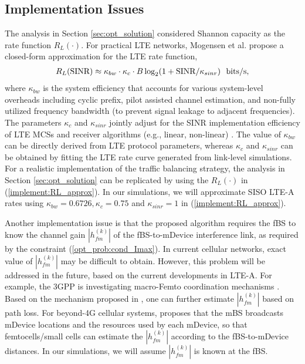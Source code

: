 \documentclass[journal,final,letterpaper,10pt,doublecolumn,twoside]{IEEEtran}
\begin{document}
\subsection{Implementation Issues} \label{subsec:Traffic-assign-Implementation}

The analysis in Section \ref{sec:opt_solution} considered  Shannon capacity as the rate function $R_L(\cdot)$. For practical LTE networks, Mogensen et al. \cite{LteRateApprox} propose a closed-form approximation for the LTE rate function,
\begin{eqnarray}
R_L(\textmd{SINR}) \approx \kappa_{bw} \cdot \kappa_{c} \cdot B
\log_2(1+\textmd{SINR} / \kappa_{sinr} ) ~~ \textmd{bits/s},
\label{implement:RL_approx}
\end{eqnarray}
where $\kappa_{bw}$ is the system efficiency that accounts for various system-level overheads including cyclic prefix,
pilot assisted channel estimation, and non-fully utilized frequency bandwidth (to prevent signal leakage to adjacent frequencies). The parameters $\kappa_{c}$ and $\kappa_{sinr}$ jointly adjust for the SINR implementation efficiency of LTE MCSs and receiver algorithms (e.g., linear, non-linear) \cite{LteRateApprox}. The value of $\kappa_{bw}$ can be directly derived from LTE protocol parameters, whereas $\kappa_{c}$ and $\kappa_{sinr}$ can be obtained by fitting the LTE rate curve generated from link-level simulations. For a realistic implementation of the traffic balancing strategy, the analysis in Section \ref{sec:opt_solution} can be replicated by using the $R_L(\cdot)$  in (\ref{implement:RL_approx}). In our simulations, we will approximate SISO LTE-A rates using $\kappa_{bw}=0.6726, \kappa_{c}=0.75$ and $\kappa_{sinr} = 1$ in (\ref{implement:RL_approx}).

Another implementation issue is that the proposed algorithm requires
the fBS to know the channel gain $|h_{fm}^{(k)}|$ of the fBS-to-mDevice
interference link, as required by the constraint
(\ref{opt_prob:cond_Imax}). In current cellular networks, exact
value of $|h_{fm}^{(k)}|$ may be difficult to obtain. However, this
problem will be addressed in the future, based on the current
developments in LTE-A. For example, the 3GPP is investigating
macro-Femto coordination mechanisms \cite{3GPP_TR_36.921_femto}.
Based on the mechanism proposed in \cite[Sec.\
7.2.2.6.2]{3GPP_TR_36.921_femto}, one can further estimate
$|h_{fm}^{(k)}|$ based on path loss. For beyond-4G cellular systems,
\cite{mBS_broadcastLocRB} proposes that the mBS broadcasts mDevice
locations and the resources used by each mDevice, so that
femtocells/small cells can estimate the $|h_{fm}^{(k)}|$ according
to the fBS-to-mDevice distances. In our simulations, we will assume
$|h_{fm}^{(k)}|$ is known at the fBS.
\end{document}
